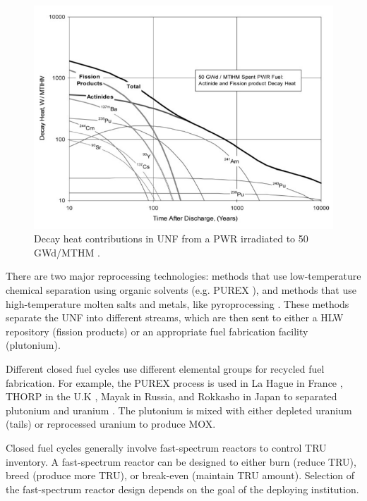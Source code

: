 \begin{figure}[htbp!]
	\begin{center}
		\includegraphics[scale=0.6]{./images/decay_heat.png}
	\end{center}
	\caption{Decay heat contributions in \gls{UNF} from a \gls{PWR} irradiated
		to 50 GWd/MTHM \cite{wigeland_separations_2006}.}
	\label{fig:decay_heat}
\end{figure}


There are two major reprocessing technologies:
methods that use low-temperature chemical separation
using organic solvents (e.g. PUREX \cite{baumgaertner_purex_1976}), and
methods that use high-temperature molten salts and metals, like pyroprocessing
\cite{laidler_development_1997}. These methods separate the \gls{UNF}
into different streams, which are then sent to either a \gls{HLW} repository
(fission products) or an appropriate fuel fabrication facility (plutonium).

Different closed fuel cycles use different elemental groups for recycled
fuel fabrication. For example, the PUREX process is used in La Hague in France
\cite{schneider_spent_2008}, THORP in the U.K \cite{riley_technology_1998},
Mayak in Russia, and Rokkasho in Japan to separated plutonium and uranium
\cite{birkett_recent_2005}. The plutonium is mixed with either depleted
uranium (tails) or reprocessed uranium to produce \gls{MOX}. 

Closed fuel cycles 
generally involve fast-spectrum reactors to control TRU inventory.
A fast-spectrum reactor can be designed to either burn (reduce TRU),
breed (produce more TRU), or break-even (maintain TRU amount).
Selection of the fast-spectrum reactor design depends on the 
goal of the deploying institution.

